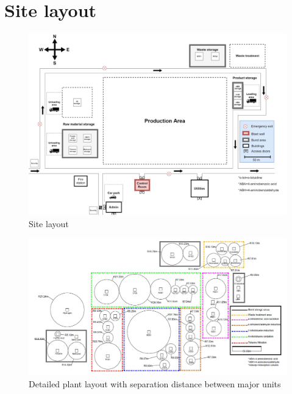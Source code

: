 \section{Site layout}

\begin{figure}[H]
    \centering
    \includegraphics[width=\linewidth]{chapters/Z-support/figures/Sitelayout.jpg}
    \caption{Site layout}
    \label{fig:site}
\end{figure}

\begin{figure}[H]
    \centering
    \includegraphics[width=\linewidth]{chapters/Z-support/figures/detailedlayout.jpg}
    \caption{Detailed plant layout with separation distance between major units}
    \label{fig:detailed_layout}
\end{figure}